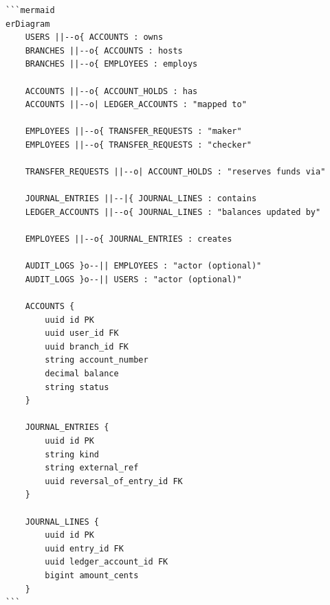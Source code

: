 \begin{center}
\begin{verbatim}
```mermaid
erDiagram
    USERS ||--o{ ACCOUNTS : owns
    BRANCHES ||--o{ ACCOUNTS : hosts
    BRANCHES ||--o{ EMPLOYEES : employs
    
    ACCOUNTS ||--o{ ACCOUNT_HOLDS : has
    ACCOUNTS ||--o| LEDGER_ACCOUNTS : "mapped to"
    
    EMPLOYEES ||--o{ TRANSFER_REQUESTS : "maker"
    EMPLOYEES ||--o{ TRANSFER_REQUESTS : "checker"
    
    TRANSFER_REQUESTS ||--o| ACCOUNT_HOLDS : "reserves funds via"
    
    JOURNAL_ENTRIES ||--|{ JOURNAL_LINES : contains
    LEDGER_ACCOUNTS ||--o{ JOURNAL_LINES : "balances updated by"
    
    EMPLOYEES ||--o{ JOURNAL_ENTRIES : creates
    
    AUDIT_LOGS }o--|| EMPLOYEES : "actor (optional)"
    AUDIT_LOGS }o--|| USERS : "actor (optional)"

    ACCOUNTS {
        uuid id PK
        uuid user_id FK
        uuid branch_id FK
        string account_number
        decimal balance
        string status
    }
    
    JOURNAL_ENTRIES {
        uuid id PK
        string kind
        string external_ref
        uuid reversal_of_entry_id FK
    }

    JOURNAL_LINES {
        uuid id PK
        uuid entry_id FK
        uuid ledger_account_id FK
        bigint amount_cents
    }
```
\end{verbatim}
\end{center}
